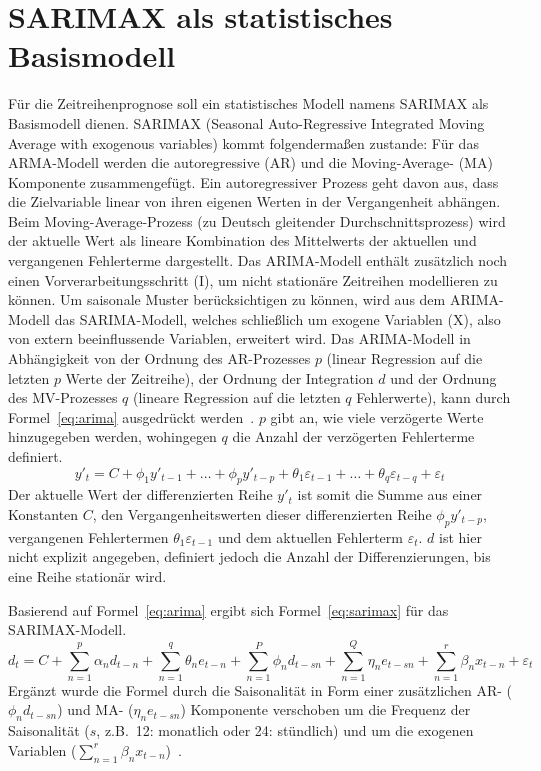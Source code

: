 \section{SARIMAX als statistisches Basismodell}
Für die Zeitreihenprognose soll ein statistisches Modell namens SARIMAX als Basismodell dienen.
SARIMAX (Seasonal Auto-Regressive Integrated Moving Average with exogenous variables) kommt folgendermaßen zustande:
Für das ARMA-Modell werden die autoregressive (AR) und die Moving-Average- (MA) Komponente zusammengefügt.
Ein autoregressiver Prozess geht davon aus, dass die Zielvariable linear von ihren eigenen Werten in der Vergangenheit abhängen.
Beim Moving-Average-Prozess (zu Deutsch gleitender Durchschnittsprozess) wird der aktuelle Wert als lineare Kombination des Mittelwerts der aktuellen und vergangenen Fehlerterme dargestellt.
Das \ac{ARIMA}-Modell enthält zusätzlich noch einen Vorverarbeitungsschritt (I), um nicht stationäre Zeitreihen modellieren zu können.
Um saisonale Muster berücksichtigen zu können, wird aus dem \ac{ARIMA}-Modell das SARIMA-Modell, welches schließlich um exogene Variablen (X), also von extern beeinflussende Variablen, erweitert wird.
Das ARIMA-Modell in Abhängigkeit von der Ordnung des AR-Prozesses $p$ (linear Regression auf die letzten $p$ Werte der Zeitreihe), der Ordnung der Integration $d$ und der Ordnung des MV-Prozesses $q$ (lineare Regression auf die letzten $q$ Fehlerwerte), kann durch Formel~\ref{eq:arima} ausgedrückt werden~\cite{Peixeiro.2022}.
$p$ gibt an, wie viele verzögerte Werte hinzugegeben werden, wohingegen $q$ die Anzahl der verzögerten Fehlerterme definiert.
\begin{equation}
 \label{eq:arima}
 y'_t = C + \phi_1 y'_{t-1} + \ldots + \phi_p y'_{t-p} + \theta_1 \varepsilon_{t-1} + \ldots + \theta_q \varepsilon_{t-q} + \varepsilon_t
\end{equation}
Der aktuelle Wert der differenzierten Reihe $y'_t$ ist somit die Summe aus einer Konstanten $C$, den Vergangenheitswerten dieser differenzierten Reihe $\phi_p y'_{t-p}$, vergangenen Fehlertermen $\theta_1 \varepsilon_{t-1}$ und dem aktuellen Fehlerterm $\varepsilon_t$.
$d$ ist hier nicht explizit angegeben, definiert jedoch die Anzahl der Differenzierungen, bis eine Reihe stationär wird.

Basierend auf Formel~\ref{eq:arima} ergibt sich Formel~\ref{eq:sarimax} für das SARIMAX-Modell.
\begin{equation}
 \label{eq:sarimax}
 d_t = C + \sum_{n=1}^{p} \alpha_n d_{t-n} + \sum_{n=1}^{q} \theta_n e_{t-n} + \sum_{n=1}^{P} \phi_n d_{t-sn} + \sum_{n=1}^{Q} \eta_n e_{t-sn} + \sum_{n=1}^{r} \beta_n x_{t-n} + \varepsilon_t
\end{equation}
Ergänzt wurde die Formel durch die Saisonalität in Form einer zusätzlichen AR- ($\phi_n d_{t-sn}$) und MA- ($\eta_n e_{t-sn}$) Komponente verschoben um die Frequenz der Saisonalität ($s$, z.B.\ 12: monatlich oder 24: stündlich) und um die exogenen Variablen ($\sum_{n=1}^{r} \beta_n x_{t-n}$)~\cite{Artley.26.4.2022}.

